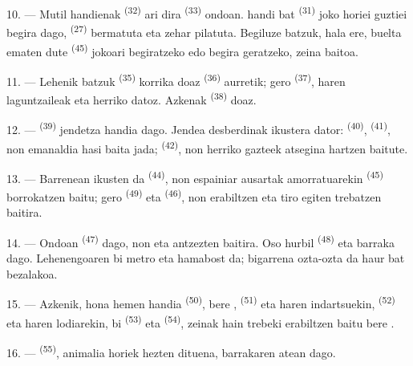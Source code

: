 10. --- Mutil handienak  \textsuperscript{(32)} ari dira
 \textsuperscript{(33)} ondoan.  handi bat
\textsuperscript{(31)} joko horiei guztiei begira dago, 
\textsuperscript{(27)}  bermatuta eta  zehar
pilatuta. Begiluze batzuk, hala ere, buelta ematen dute 
\textsuperscript{(45)} jokoari begiratzeko edo 
begira geratzeko, zeina  baitoa.

11. --- Lehenik  batzuk \textsuperscript{(35)} korrika doaz
 \textsuperscript{(36)} aurretik; gero 
\textsuperscript{(37)}, haren laguntzaileak eta herriko 
datoz. Azkenak  \textsuperscript{(38)} doaz.

\VUsaut{5.0mm}
\VUsaut{3.6mm}

12. ---  \textsuperscript{(39)} jendetza handia dago. Jendea
 desberdinak ikustera dator: 
\textsuperscript{(40)},  \textsuperscript{(41)}, non emanaldia hasi
baita jada;  \textsuperscript{(42)}, non herriko gazteek
 atsegina hartzen baitute.

13. --- Barrenean  ikusten da \textsuperscript{(44)}, non
 espainiar ausartak  amorratuarekin
\textsuperscript{(45)} borrokatzen baitu; gero 
\textsuperscript{(49)} eta  \textsuperscript{(46)}, non
 erabiltzen eta  tiro egiten trebatzen baitira.

14. --- Ondoan  \textsuperscript{(47)} dago, non
 eta  antzezten baitira. Oso hurbil
 \textsuperscript{(48)} eta  barraka dago.
Lehenengoaren  bi metro eta hamabost da; bigarrena ozta-ozta da
haur bat bezalakoa.

15. --- Azkenik, hona hemen  handia
\textsuperscript{(50)}, bere , 
\textsuperscript{(51)} eta haren  indartsuekin,
 \textsuperscript{(52)} eta haren  lodiarekin,
bi  \textsuperscript{(53)} eta 
\textsuperscript{(54)}, zeinak hain trebeki erabiltzen baitu bere
.

16. ---  \textsuperscript{(55)}, animalia horiek hezten
dituena, barrakaren atean dago.
\VUsaut{6.0mm}
\VUfilet{22mm}
